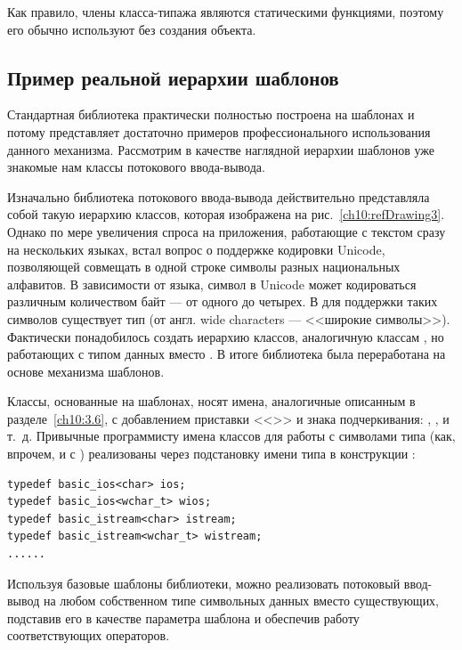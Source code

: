 Как правило, члены класса-типажа являются статическими функциями, поэтому его обычно используют без создания объекта.

\subsection[Пример реальной иерархии шаблонов]{Пример реальной иерархии шаблонов}
Стандартная библиотека  практически полностью построена на шаблонах и потому представляет достаточно примеров
профессионального использования данного механизма.  Рассмотрим в качестве наглядной иерархии шаблонов уже знакомые нам
классы потокового ввода-вывода.

Изначально библиотека потокового ввода-вывода действительно представляла собой такую иерархию классов, которая
изображена на рис.~\ref{ch10:refDrawing3}. Однако по мере увеличения спроса на приложения, работающие с текстом сразу на
нескольких языках, встал вопрос о поддержке кодировки Unicode, позволяющей совмещать в одной строке символы разных
национальных алфавитов. В зависимости от языка, символ в Unicode может кодироваться различным количеством байт --- от
одного до четырех. В  для поддержки таких символов существует тип  (от англ. wide
characters --- <<широкие символы>>). Фактически понадобилось создать иерархию классов, аналогичную классам 
, но работающих с типом данных  вместо
. В итоге библиотека  была переработана на основе механизма
шаблонов.

Классы, основанные на шаблонах, носят имена, аналогичные описанным в разделе~\ref{ch10:3.6}, с добавлением приставки
<<>> и знака подчеркивания: ,
,   и т.~д. Привычные программисту имена
классов для работы с символами типа  (как, впрочем, и с )
реализованы через подстановку имени типа в конструкции :
\begin{lstlisting}
typedef basic_ios<char> ios;
typedef basic_ios<wchar_t> wios;
typedef basic_istream<char> istream;
typedef basic_istream<wchar_t> wistream;
......
\end{lstlisting}

Используя базовые шаблоны библиотеки, можно реализовать потоковый ввод-вывод на любом собственном типе символьных данных
вместо существующих, подставив его в качестве параметра шаблона и обеспечив работу соответствующих операторов.

